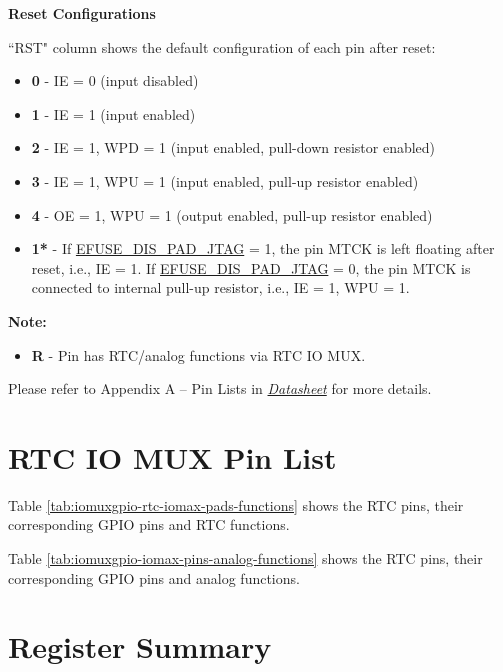 \documentclass[main\_\_EN.tex]{subfiles}
\begin{document}
\textbf{Reset Configurations}

``RST" column shows the default configuration of each pin after reset:

\begin{itemize}
\item \textbf{0} - IE = 0 (input disabled)
\item \textbf{1} - IE = 1 (input enabled)
\item \textbf{2} - IE = 1, WPD = 1 (input enabled, pull-down resistor enabled)
\item \textbf{3} - IE = 1, WPU = 1 (input enabled, pull-up resistor enabled)
\item \textbf{4} - OE = 1, WPU = 1 (output enabled, pull-up resistor enabled)
\item \textbf{1*} - If \hyperref[fielddesc:EFUSEDISPADJTAG]{EFUSE\_DIS\_PAD\_JTAG} = 1, the pin MTCK is left floating after reset, i.e., IE = 1. If \hyperref[fielddesc:EFUSEDISPADJTAG]{EFUSE\_DIS\_PAD\_JTAG} = 0, the pin MTCK is connected to internal pull-up resistor, i.e., IE = 1, WPU = 1.
\end{itemize}
\textbf{Note:}

\begin{itemize}
\item \textbf{R} - Pin has RTC/analog functions via RTC IO MUX.
\end{itemize}

Please refer to Appendix A – \chipname{} Pin Lists in {\it{\href{https://www.espressif.com/sites/default/files/documentation/esp32-s3_datasheet_en.pdf}{\chipname{} Datasheet}}} for more details.

\section{RTC IO MUX Pin List}
\label{sec:rtcmux_pins}

Table \ref{tab:iomuxgpio-rtc-iomax-pads-functions} shows the RTC pins, their corresponding GPIO pins and RTC functions.



Table \ref{tab:iomuxgpio-iomax-pins-analog-functions} shows the RTC pins, their corresponding GPIO pins and analog functions.




\hypertarget{iomuxgpio-reg-summ}{}
\section{Register Summary}
\end{document}
